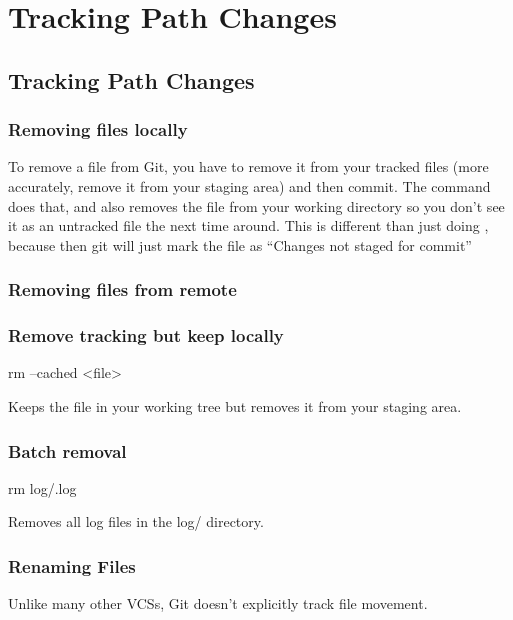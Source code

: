 
\chapter{Tracking Path Changes}
\section{Tracking Path Changes}

\subsection{Removing files locally}
To remove a file from Git, you have to remove it from your tracked files (more accurately, remove it from your staging area) and then commit. The  command does that, and also removes the file from your working directory so you don’t see it as an untracked file the next time around.\newline
This is different than just doing , because then git will just mark the file as “Changes not staged for commit”

\subsection{Removing files from remote}

\subsection{Remove tracking but keep locally}

\begin{gitBashBox}
rm --cached <file>    
\end{gitBashBox}
Keeps the file in your working tree but removes it from your staging area.

\subsection{Batch removal}
\begin{gitBashBox}
rm log/\*.log
\end{gitBashBox}\footnotemark
Removes all log files in the log/ directory.




\subsection{Renaming Files}
Unlike many other VCSs, Git doesn’t explicitly track file movement.

